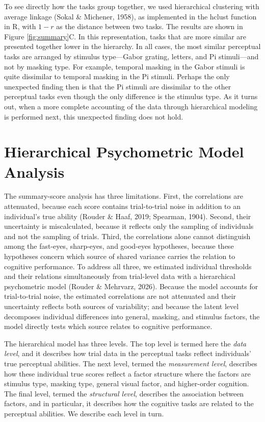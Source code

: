 \documentclass[
  ,man]{apa6}
\begin{document}
To see directly how the tasks group together, we used hierarchical clustering with average linkage (Sokal \& Michener, 1958), as implemented in the hclust function in R, with \(1 - r\) as the distance between two tasks. The results are shown in Figure \ref{fig:summary}C. In this representation, tasks that are more similar are presented together lower in the hierarchy. In all cases, the most similar perceptual tasks are arranged by stimulus type---Gabor grating, letters, and Pi stimuli---and not by masking type. For example, temporal masking in the Gabor stimuli is quite dissimilar to temporal masking in the Pi stimuli. Perhaps the only unexpected finding then is that the Pi stimuli are dissimilar to the other perceptual tasks even though the only difference is the stimulus type. As it turns out, when a more complete accounting of the data through hierarchical modeling is performed next, this unexpected finding does not hold.

\section{Hierarchical Psychometric Model Analysis}\label{hierarchical-psychometric-model-analysis}

The summary-score analysis has three limitations. First, the correlations are attenuated, because each score contains trial-to-trial noise in addition to an individual's true ability (Rouder \& Haaf, 2019; Spearman, 1904). Second, their uncertainty is miscalculated, because it reflects only the sampling of individuals and not the sampling of trials. Third, the correlations alone cannot distinguish among the fast-eyes, sharp-eyes, and good-eyes hypotheses, because these hypotheses concern which source of shared variance carries the relation to cognitive performance. To address all three, we estimated individual thresholds and their relations simultaneously from trial-level data with a hierarchical psychometric model (Rouder \& Mehrvarz, 2026). Because the model accounts for trial-to-trial noise, the estimated correlations are not attenuated and their uncertainty reflects both sources of variability; and because the latent level decomposes individual differences into general, masking, and stimulus factors, the model directly tests which source relates to cognitive performance.

The hierarchical model has three levels. The top level is termed here the \emph{data level}, and it describes how trial data in the perceptual tasks reflect individuals' true perceptual abilities. The next level, termed the \emph{measurement level}, describes how these individual true scores reflect a factor structure where the factors are stimulus type, masking type, general visual factor, and higher-order cognition. The final level, termed the \emph{structural level}, describes the association between factors, and in particular, it describes how the cognitive tasks are related to the perceptual abilities. We describe each level in turn.
\end{document}
